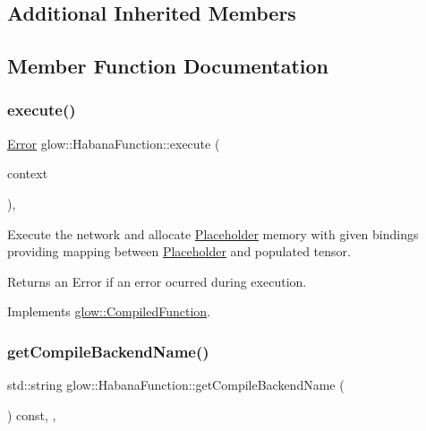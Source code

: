 \subsection*{Additional Inherited Members}


\subsection{Member Function Documentation}
\mbox{\label{classglow_1_1_habana_function_ad3984e53ddb4615368e53acdc2418890}} 
\subsubsection{\texorpdfstring{execute()}{execute()}}
{\footnotesize\ttfamily \hyperlink{namespaceglow_afdb176c3a672ef66db0ecfc19a8d39bf}{Error} glow\+::\+Habana\+Function\+::execute (\begin{DoxyParamCaption}\item[{\hyperlink{classglow_1_1_execution_context}{Execution\+Context} $\ast$}]{context }\end{DoxyParamCaption})\hspace{0.3cm}{\ttfamily [override]}, {\ttfamily [virtual]}}

Execute the network and allocate \hyperlink{classglow_1_1_placeholder}{Placeholder} memory with given {\ttfamily bindings} providing mapping between \hyperlink{classglow_1_1_placeholder}{Placeholder} and populated tensor. \begin{DoxyReturn}{Returns}
an Error if an error ocurred during execution. 
\end{DoxyReturn}


Implements \hyperlink{classglow_1_1_compiled_function_ac8dd94f2ee7129a435f1701b6a9f419e}{glow\+::\+Compiled\+Function}.

\mbox{\label{classglow_1_1_habana_function_a6bafdb9b97ae532ecc58edbba6e74daf}} 
\subsubsection{\texorpdfstring{get\+Compile\+Backend\+Name()}{getCompileBackendName()}}
{\footnotesize\ttfamily std\+::string glow\+::\+Habana\+Function\+::get\+Compile\+Backend\+Name (\begin{DoxyParamCaption}{ }\end{DoxyParamCaption}) const\hspace{0.3cm}{\ttfamily [inline]}, {\ttfamily [override]}, {\ttfamily [virtual]}}

